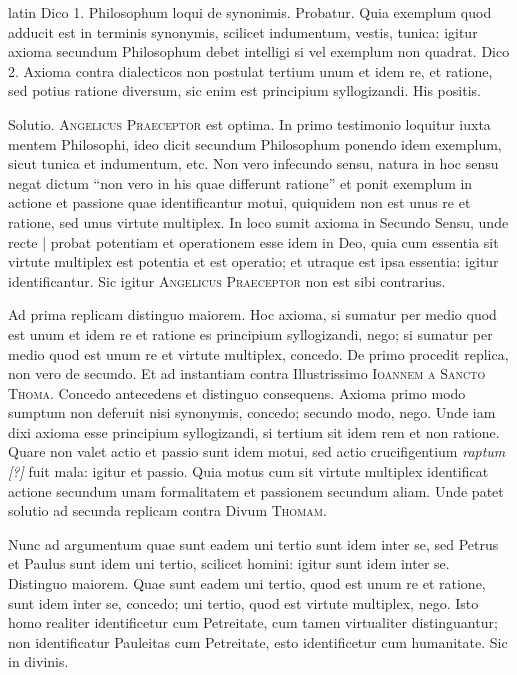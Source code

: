 \begin{otherlanguage*}{latin}
\pstart
Dico 1. Philosophum loqui de synonimis. Probatur. Quia exemplum quod adducit est in terminis synonymis, scilicet indumentum, vestis, tunica:
igitur axioma secundum Philosophum debet intelligi si vel exemplum non quadrat. Dico 2. Axioma contra dialecticos non postulat tertium unum et idem re, et ratione, sed potius ratione diversum, sic enim est principium syllogizandi. His positis. 
\pend

\pstart
Solutio. \textsc{Angelicus Praeceptor} est optima. In primo testimonio loquitur iuxta mentem Philosophi, ideo dicit secundum Philosophum ponendo idem exemplum, sicut tunica et indumentum, etc. Non vero infecundo sensu, natura in hoc sensu negat dictum \enquote{non vero in his quae differunt ratione} et ponit exemplum in actione et passione quae identificantur motui, quiquidem non est unus re et ratione, sed unus virtute multiplex. In loco  sumit axioma in Secundo Sensu, unde recte \textnormal{|} probat potentiam et operationem esse idem in Deo, quia cum essentia sit virtute multiplex est potentia et est operatio; et utraque est ipsa essentia:
igitur identificantur. Sic igitur \textsc{Angelicus Praeceptor} non est sibi contrarius. 
\pend

\pstart
Ad prima replicam distinguo maiorem. Hoc axioma, si sumatur per medio quod est unum et idem re et ratione es principium syllogizandi, nego; si sumatur per medio quod est unum re et virtute multiplex, concedo. De primo procedit replica, non vero de secundo. Et ad instantiam contra Illustrissimo \textsc{Ioannem a Sancto Thoma}. Concedo antecedens et distinguo consequens. Axioma primo modo sumptum non deferuit nisi synonymis, concedo; secundo modo, nego. Unde iam dixi axioma esse principium syllogizandi, si tertium sit idem rem et non ratione. Quare non valet actio et passio sunt idem motui, sed actio crucifigentium \emph{raptum [?]} fuit mala:
igitur et passio. Quia motus cum sit virtute multiplex identificat actione secundum unam formalitatem et passionem secundum aliam. Unde patet solutio ad secunda replicam contra Divum \textsc{Thomam}. 
\pend

\pstart
Nunc ad argumentum quae sunt eadem uni tertio sunt idem inter se, sed Petrus et Paulus sunt idem uni tertio, scilicet homini:
igitur sunt idem inter se. Distinguo maiorem. Quae sunt eadem uni tertio, quod est unum re et ratione, sunt idem inter se, concedo; uni tertio, quod est virtute multiplex, nego. Isto homo realiter identificetur cum Petreitate, cum tamen virtualiter distinguantur; non identificatur Pauleitas cum Petreitate, esto identificetur cum humanitate. Sic in divinis. 
\pend


\end{otherlanguage*}
